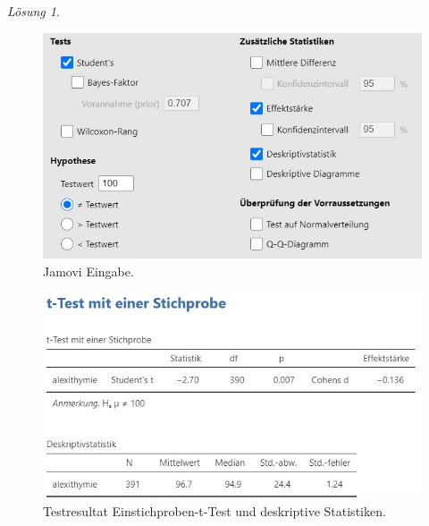 \documentclass[
]{book}
\theoremstyle{definition}
\theoremstyle{definition}
\theoremstyle{definition}
\theoremstyle{definition}
\theoremstyle{remark}
\newtheorem*{solution}{Lösung}
\begin{document}
\begin{solution}
\leavevmode

\begin{figure}
\includegraphics[width=1\linewidth]{figures/05-exr-alexithymie-jmv-input} \caption{Jamovi Eingabe.}\label{fig:sol-alexithymie-input}
\end{figure}

\begin{figure}
\includegraphics[width=1\linewidth]{figures/05-exr-alexithymie-jmv-output} \caption{Testresultat Einstichproben-t-Test und deskriptive Statistiken.}\label{fig:sol-alexithymie-output}
\end{figure}

\end{solution}
\end{document}

